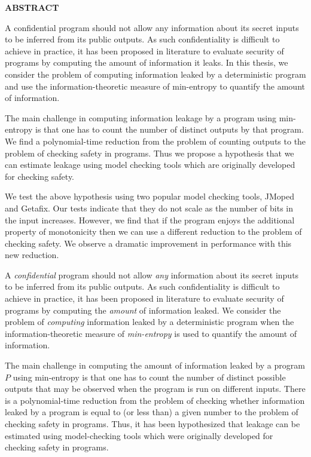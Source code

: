 \newpage
{}

\centerline{\bf \large ABSTRACT}
\vskip 10mm 

A confidential program should not allow any information about its secret inputs to be inferred from its public outputs. As such confidentiality is difficult to achieve in practice, it has been proposed in literature to evaluate security of programs by computing the amount of information it leaks. In this thesis, we consider the problem of computing information leaked by a deterministic program and use the information-theoretic measure of min-entropy to quantify the amount of information.

The main challenge in computing information leakage by a program using min-entropy is that one has to count the number of distinct outputs by that program. We find a polynomial-time reduction from the problem of counting outputs to the problem of checking safety in programs. Thus we propose a hypothesis that we can estimate leakage using model checking tools which are originally developed for checking safety.

We test the above hypothesis using two popular model checking tools, JMoped and Getafix. Our tests indicate that they do not scale as the number of bits in the input increases. However, we find that if the program enjoys the additional property of monotonicity then we can use a different reduction to the problem of checking safety. We observe a dramatic improvement in performance with this new reduction.

\iffalse

A \emph{confidential} program should not allow \emph{any} information about its secret inputs to be inferred from its public outputs.  As such confidentiality is difficult to achieve in practice, it has been proposed in literature to evaluate security of programs by computing the \emph{amount} of information leaked. %
We consider the problem of \emph{computing} 
information leaked by a deterministic  program  when the information-theoretic measure of \emph{min-entropy} is used to quantify the amount of information. 

The main challenge in computing the amount of  information leaked by a program $P$ using min-entropy is that one has to count the number of distinct possible outputs that may be observed when the program is run on different inputs. There is a polynomial-time reduction from the problem of checking whether information leaked by a program is equal to  (or less than) a given number to the problem of checking safety in  programs.  Thus, %
it has been hypothesized that leakage can be estimated using model-checking tools which were  originally developed for checking safety in programs.  
 
